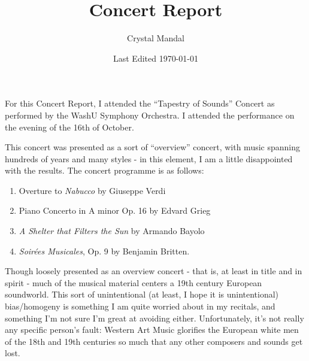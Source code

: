 \documentclass{article}
\title{\vspace*{-72pt} Concert Report}
\author{Crystal Mandal}
\date{Last Edited \today}
\begin{document}
  \maketitle


For this Concert Report, I attended the ``Tapestry of Sounds'' Concert
as performed by the WashU Symphony Orchestra. I attended the performance
on the evening of the 16th of October.

This concert was presented as a sort of ``overview'' concert, with music
spanning hundreds of years and many styles - in this element, I am a
little disappointed with the results. The concert programme is as
follows:

\begin{enumerate}
\item
  Overture to \emph{Nabucco} by Giuseppe Verdi
\item
  Piano Concerto in A minor Op. 16 by Edvard Grieg
\item
  \emph{A Shelter that Filters the Sun} by Armando Bayolo
\item
  \emph{Soirées Musicales}, Op. 9 by Benjamin Britten.
\end{enumerate}

Though loosely presented as an overview concert - that is, at least in
title and in spirit - much of the musical material centers a 19th
century European soundworld. This sort of unintentional (at least, I hope
it is unintentional) bias/homogeny is something I am quite worried about in
my recitals, and something I'm not sure I'm great at avoiding either. Unfortunately,
it's not really any specific person's fault: Western Art Music glorifies the European
white men of the 18th and 19th centuries so much that any other composers and sounds
get lost.
\end{document}
